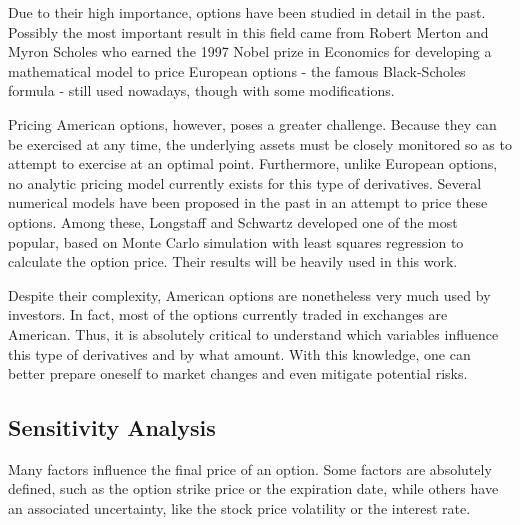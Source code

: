 \documentclass[a4paper,prd,twocolumn,nofootinbib,superscriptaddress,floatfix]{revtex4}
\begin{document}

Due to their high importance, options have been studied in detail in the past.
Possibly the most important result in this field came from Robert Merton and Myron Scholes who earned the 1997 Nobel prize in Economics for developing a mathematical model to price European options - the famous Black-Scholes formula - still used nowadays, though with some modifications.

Pricing American options, however, poses a greater challenge. Because they can be exercised at any time, the underlying assets must be closely monitored so as to attempt to exercise at an optimal point.
Furthermore, unlike European options, no analytic pricing model currently exists for this type of derivatives. Several numerical models have been proposed in the past in an attempt to price these options. Among these, Longstaff and Schwartz developed one of the most popular, based on Monte Carlo simulation with least squares regression to calculate the option price. Their results will be heavily used in this work.

Despite their complexity, American options are nonetheless very much used by investors. In fact, most of the options currently traded in exchanges are American. Thus, it is absolutely critical to understand which variables influence this type of derivatives and by what amount. With this knowledge, one can better prepare oneself to market changes and even mitigate potential risks.

\subsection{Sensitivity Analysis}
Many factors influence the final price of an option.
Some factors are absolutely defined, such as the option strike price or the expiration date, while others have an associated uncertainty, like the stock price volatility or the interest rate.
\end{document}
